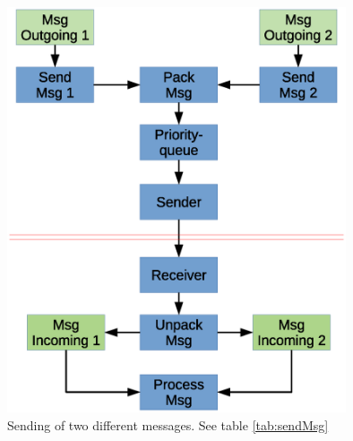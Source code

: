 \documentclass[]{scrreprt}
\begin{document}
	\begin{figure}[H]
		\centering
		\includegraphics[width=10cm]{images/sendMsg.eps}
		\caption{Sending of two different messages. See table \ref{tab:sendMsg}}
		\label{fig:sendMsg}
	\end{figure}
\end{document}

